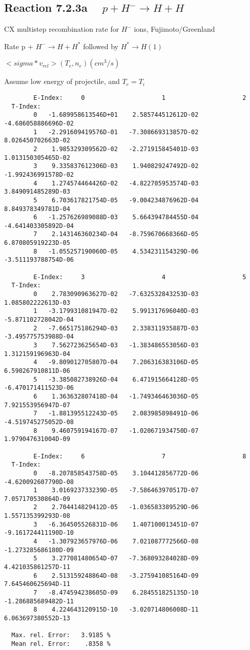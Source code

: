 \subsection{
Reaction 7.2.3a   $\quad p + H^{-} \rightarrow  H + H$
}
  CX multistep recombination rate for $H^-$ ions,
  Fujimoto/Greenland

  Rate p + $H^- \rightarrow H + H^*$ followed by $H^* \rightarrow H(1)$

$ <sigma*v_{rel}>(T_e,n_e) (cm^3/s)$

Assume low energy of projectile, and $T_e = T_i$

\begin{verbatim}
        E-Index:     0                     1                     2
  T-Index:
        0   -1.689958613546D+01    2.585744512612D-02   -4.686058886696D-02
        1   -2.291609419576D-01   -7.308669313857D-02    8.026450702663D-02
        2    1.985329309562D-02   -2.271915845401D-03    1.013150305465D-02
        3    9.335837612306D-03    1.940829247492D-02   -1.992436991578D-02
        4    1.274574464426D-02   -4.822705953574D-03    3.849091485289D-03
        5    6.703617821754D-05   -9.004234876962D-04    8.849378349781D-04
        6   -1.257626989088D-03    5.664394784455D-04   -4.641403305892D-04
        7    2.143146360234D-04   -8.759670668366D-05    6.870805919223D-05
        8   -1.055257190060D-05    4.534231154329D-06   -3.511193788754D-06

        E-Index:     3                     4                     5
  T-Index:
        0    2.783090963627D-02   -7.632532843253D-03    1.085802222613D-03
        1   -3.179931081947D-02    5.991317696040D-03   -5.871102728042D-04
        2   -7.665175186294D-03    2.338311935887D-03   -3.495775753988D-04
        3    7.562723625654D-03   -1.383486553056D-03    1.312159196963D-04
        4   -9.809012705807D-04    7.206316383106D-05    6.590267910811D-06
        5   -3.385082738926D-04    6.471915664128D-05   -6.470171411523D-06
        6    1.363632807418D-04   -1.749346463036D-05    7.921553956947D-07
        7   -1.881395512243D-05    2.083985898491D-06   -4.519745275052D-08
        8    9.460759194167D-07   -1.020671934750D-07    1.979047631004D-09

        E-Index:     6                     7                     8
  T-Index:
        0   -8.207858543758D-05    3.104412856772D-06   -4.620092607790D-08
        1    3.016923733239D-05   -7.586463970517D-07    7.057170530864D-09
        2    2.704414829412D-05   -1.036583389529D-06    1.557135399293D-08
        3   -6.364505526831D-06    1.407100013451D-07   -9.161724411190D-10
        4   -1.307923657976D-06    7.021087772566D-08   -1.273285686180D-09
        5    3.277081480654D-07   -7.368093284028D-09    4.421035861257D-11
        6    2.513159248864D-08   -3.275941085164D-09    7.645460625694D-11
        7   -8.474594238605D-09    6.284551825135D-10   -1.286885689482D-11
        8    4.224643120915D-10   -3.020714806008D-11    6.063697380552D-13

  Max. rel. Error:   3.9185 %
  Mean rel. Error:    .8358 %
\end{verbatim}
